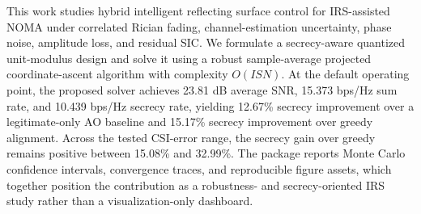 This work studies hybrid intelligent reflecting surface control for IRS-assisted NOMA under correlated Rician fading, channel-estimation uncertainty, phase noise, amplitude loss, and residual SIC. We formulate a secrecy-aware quantized unit-modulus design and solve it using a robust sample-average projected coordinate-ascent algorithm with complexity $O(ISN)$. At the default operating point, the proposed solver achieves 23.81 dB average SNR, 15.373 bps/Hz sum rate, and 10.439 bps/Hz secrecy rate, yielding 12.67\% secrecy improvement over a legitimate-only AO baseline and 15.17\% secrecy improvement over greedy alignment. Across the tested CSI-error range, the secrecy gain over greedy remains positive between 15.08\% and 32.99\%. The package reports Monte Carlo confidence intervals, convergence traces, and reproducible figure assets, which together position the contribution as a robustness- and secrecy-oriented IRS study rather than a visualization-only dashboard.
